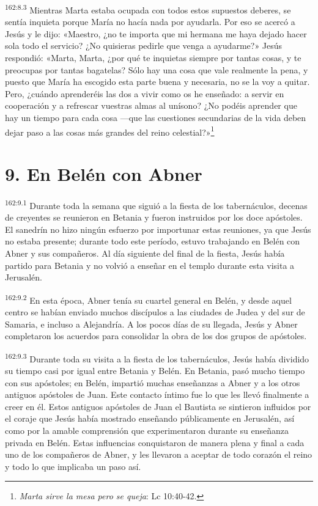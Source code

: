 \par
\textsuperscript{162:8.3} Mientras Marta estaba ocupada con todos estos supuestos deberes, se sentía inquieta porque María no hacía nada por ayudarla. Por eso se acercó a Jesús y le dijo: «Maestro, ¿no te importa que mi hermana me haya dejado hacer sola todo el servicio? ¿No quisieras pedirle que venga a ayudarme?» Jesús respondió: «Marta, Marta, ¿por qué te inquietas siempre por tantas cosas, y te preocupas por tantas bagatelas? Sólo hay una cosa que vale realmente la pena, y puesto que María ha escogido esta parte buena y necesaria, no se la voy a quitar. Pero, ¿cuándo aprenderéis las dos a vivir como os he enseñado: a servir en cooperación y a refrescar vuestras almas al unísono? ¿No podéis aprender que hay un tiempo para cada cosa ---que las cuestiones secundarias de la vida deben dejar paso a las cosas más grandes del reino celestial?»\footnote{\textit{Marta sirve la mesa pero se queja}: Lc 10:40-42.}

\section*{9. En Belén con Abner}
\par
\textsuperscript{162:9.1} Durante toda la semana que siguió a la fiesta de los tabernáculos, decenas de creyentes se reunieron en Betania y fueron instruidos por los doce apóstoles. El sanedrín no hizo ningún esfuerzo por importunar estas reuniones, ya que Jesús no estaba presente; durante todo este período, estuvo trabajando en Belén con Abner y sus compañeros. Al día siguiente del final de la fiesta, Jesús había partido para Betania y no volvió a enseñar en el templo durante esta visita a Jerusalén.

\par
\textsuperscript{162:9.2} En esta época, Abner tenía su cuartel general en Belén, y desde aquel centro se habían enviado muchos discípulos a las ciudades de Judea y del sur de Samaria, e incluso a Alejandría. A los pocos días de su llegada, Jesús y Abner completaron los acuerdos para consolidar la obra de los dos grupos de apóstoles.

\par
\textsuperscript{162:9.3} Durante toda su visita a la fiesta de los tabernáculos, Jesús había dividido su tiempo casi por igual entre Betania y Belén. En Betania, pasó mucho tiempo con sus apóstoles; en Belén, impartió muchas enseñanzas a Abner y a los otros antiguos apóstoles de Juan. Este contacto íntimo fue lo que les llevó finalmente a creer en él. Estos antiguos apóstoles de Juan el Bautista se sintieron influidos por el coraje que Jesús había mostrado enseñando públicamente en Jerusalén, así como por la amable comprensión que experimentaron durante su enseñanza privada en Belén. Estas influencias conquistaron de manera plena y final a cada uno de los compañeros de Abner, y les llevaron a aceptar de todo corazón el reino y todo lo que implicaba un paso así.

